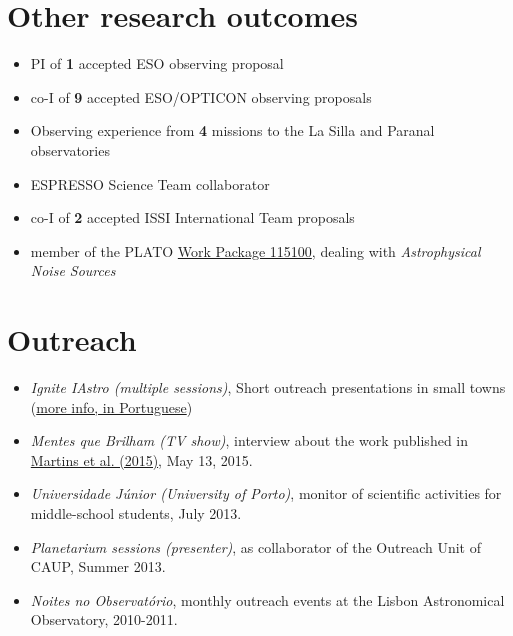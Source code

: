 \documentclass[10pt]{article}
\renewcommand{\labelenumi}{-\label{A\theenumi}}
\begin{document}
\fi


\ifoutcomes

\section{Other research outcomes}

\begin{itemize}\itemsep-0.3em
  \item PI of \textbf{1} accepted ESO observing proposal
  \item co-I of \textbf{9} accepted ESO/OPTICON observing proposals
  \item Observing experience from \textbf{4} missions to the La Silla and Paranal observatories
  \item ESPRESSO Science Team collaborator
  \item co-I of \textbf{2} accepted ISSI International Team proposals
  \item member of the PLATO 
        \href{https://warwick.ac.uk/fac/sci/physics/research/astro/plato-science/research/researchareas/exoplanets/wp115100}{Work Package 115100},
        dealing with \emph{Astrophysical Noise Sources}

\end{itemize}

\fi




\vspace{-1em}

\ifoutreach

  \section{Outreach}
    \begin{itemize}
    \item \emph{Ignite IAstro (multiple sessions)}, Short outreach presentations in small towns %
          (\href{http://www.iastro.pt/outreach/activities/ignite/}{more info, in Portuguese})\\[-1.5em]
    \item \emph{Mentes que Brilham (TV show)}, interview about the work published in \href{http://adsabs.harvard.edu/cgi-bin/nph-abs_connect?fforward=http://dx.doi.org/10.1051/0004-6361/201425298}{Martins et al. (2015)}, May 13, 2015. \\[-1.5em]
    \item \emph{Universidade Júnior (University of Porto)}, monitor of scientific activities for middle-school students, July 2013. \\[-1.5em]
    \item \emph{Planetarium sessions (presenter)}, as collaborator of the Outreach Unit of CAUP, Summer 2013. \\[-1.5em]
    \item \emph{Noites no Observatório}, monthly outreach events at the Lisbon Astronomical Observatory, 2010-2011.
    \end{itemize}
\end{document}
